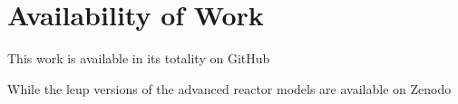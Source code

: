 \chapter{Availability of Work}
\label{sec:avail_work}

This work is available in its totality on GitHub

While the \gls{leup} versions of the advanced reactor models are available on Zenodo 


